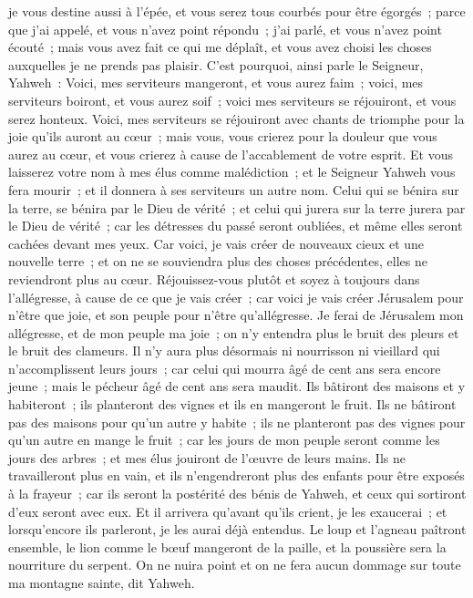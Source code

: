 \begin{multicols}{2}
je vous destine aussi à l'épée, et vous serez tous courbés pour être égorgés~; parce que j'ai appelé, et vous n'avez point répondu~; j'ai parlé, et vous n'avez point écouté~; mais vous avez fait ce qui me déplaît, et vous avez choisi les choses auxquelles je ne prends pas plaisir.
C'est pourquoi, ainsi parle le Seigneur, Yahweh~: Voici, mes serviteurs mangeront, et vous aurez faim~; voici, mes serviteurs boiront, et vous aurez soif~; voici mes serviteurs se réjouiront, et vous serez honteux.
Voici, mes serviteurs se réjouiront avec chants de triomphe pour la joie qu'ils auront au cœur~; mais vous, vous crierez pour la douleur que vous aurez au cœur, et vous crierez à cause de l'accablement de votre esprit.
Et vous laisserez votre nom à mes élus comme malédiction~; et le Seigneur Yahweh vous fera mourir~; et il donnera à ses serviteurs un autre nom.
Celui qui se bénira sur la terre, se bénira par le Dieu de vérité~; et celui qui jurera sur la terre jurera par le Dieu de vérité~; car les détresses du passé seront oubliées, et même elles seront cachées devant mes yeux.
Car voici, je vais créer de nouveaux cieux et une nouvelle terre~; et on ne se souviendra plus des choses précédentes, elles ne reviendront plus au cœur.
Réjouissez-vous plutôt et soyez à toujours dans l'allégresse, à cause de ce que je vais créer~; car voici je vais créer Jérusalem pour n'être que joie, et son peuple pour n'être qu'allégresse.
Je ferai de Jérusalem mon allégresse, et de mon peuple ma joie~; on n'y entendra plus le bruit des pleurs et le bruit des clameurs.
Il n'y aura plus désormais ni nourrisson ni vieillard qui n'accomplissent leurs jours~; car celui qui mourra âgé de cent ans sera encore jeune~; mais le pécheur âgé de cent ans sera maudit.
Ils bâtiront des maisons et y habiteront~; ils planteront des vignes et ils en mangeront le fruit.
Ils ne bâtiront pas des maisons pour qu'un autre y habite~; ils ne planteront pas des vignes pour qu'un autre en mange le fruit~; car les jours de mon peuple seront comme les jours des arbres~; et mes élus jouiront de l'œuvre de leurs mains.
Ils ne travailleront plus en vain, et ils n'engendreront plus des enfants pour être exposés à la frayeur~; car ils seront la postérité des bénis de Yahweh, et ceux qui sortiront d'eux seront avec eux.
Et il arrivera qu'avant qu'ils crient, je les exaucerai~; et lorsqu'encore ils parleront, je les aurai déjà entendus.
Le loup et l'agneau paîtront ensemble, le lion comme le bœuf mangeront de la paille, et la poussière sera la nourriture du serpent. On ne nuira point et on ne fera aucun dommage sur toute ma montagne sainte, dit Yahweh.

\end{multicols}

